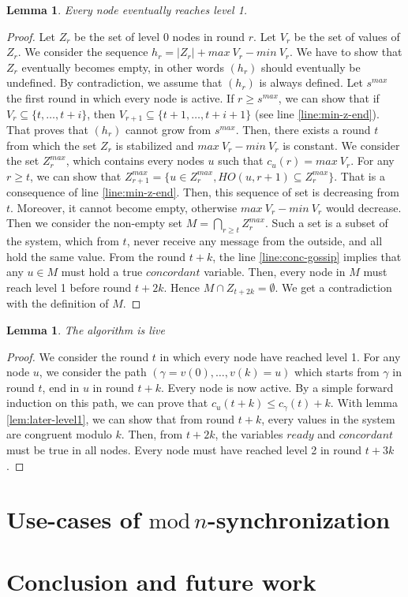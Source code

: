 \documentclass[11pt,letterpaper]{article}
\renewcommand{\leq}{\leqslant}
\renewcommand{\geq}{\geqslant}
\newtheorem{lem}[thm]{Lemma}
\newcommand{\cent}{\gamma}
\begin{document}
\begin{lem}
	Every node eventually reaches level 1.
\end{lem}
\begin{proof}
	Let $Z_r$ be the set of level 0 nodes in round $r$.
	Let $V_r$ be the set of values of $Z_r$.
	We consider the sequence $h_r = |Z_r| + max~V_r - min~V_r$.
	We have to show that $Z_r$ eventually becomes empty, in other words $(h_r)$ should eventually be undefined.
	By contradiction, we assume that $(h_r)$ is always defined.
	Let $s^{max}$ the first round in which every node is active.
	If $r \geq s^{max}$, we can show that if $V_r \subseteq \{t, \dots, t+i\}$, then $V_{r+1} \subseteq \{t+1, \dots , t+i+1\}$ (see line \ref{line:min-z-end}).
	That proves that $(h_r)$ cannot grow from $s^{max}$.
	Then, there exists a round $t$ from which the set $Z_r$ is stabilized and $max~V_r - min~V_r$ is constant.
	We consider the set $Z_r^{max}$, which contains every nodes $u$ such that $c_u(r) = max~V_r$.
	For any $r \geq t$, we can show that $Z_{r+1}^{max} = \{u \in Z_r^{max}, HO(u, r+1) \subseteq Z_r^{max}\}$. That is a consequence of line \ref{line:min-z-end}.
	Then, this sequence of set is decreasing from $t$. Moreover, it cannot become empty, otherwise $max~V_r - min~V_r$ would decrease.
	Then we consider the non-empty set $M = \bigcap\limits_{r \geq t} Z_r^{max}$.
	Such a set is a subset of the system, which from $t$, never receive any message from the outside, and all hold the same value.
	From the round $t+k$, the line \ref{line:conc-gossip} implies that any $u \in M$ must hold a true $concordant$ variable.
	Then, every node in $M$ must reach level 1 before round $t+2k$. Hence $M \cap Z_{t+2k} = \emptyset$.
	We get a contradiction with the definition of $M$.
\end{proof}

\begin{lem}
	The algorithm is live
\end{lem}
\begin{proof}
	We consider the round $t$ in which every node have reached level 1.
	For any node $u$, we consider the path $(\cent = v(0), \dots, v(k) = u)$ which starts from $\cent$ in round $t$, end in $u$ in round $t+k$.
	Every node is now active.
	By a simple forward induction on this path, we can prove that $c_u(t+k) \leq c_\cent(t)+k$.
	With lemma \ref{lem:later-level1}, we can show that from round $t+k$, every values in the system are congruent modulo $k$.
	Then, from $t+2k$, the variables $ready$ and $concordant$ must be true in all nodes.
	Every node must have reached level 2 in round $t+3k$.
\end{proof}

\section{Use-cases of $\mathrm{mod}\,n$-synchronization}

\section{Conclusion and future work}


\printbibliography
\end{document}
